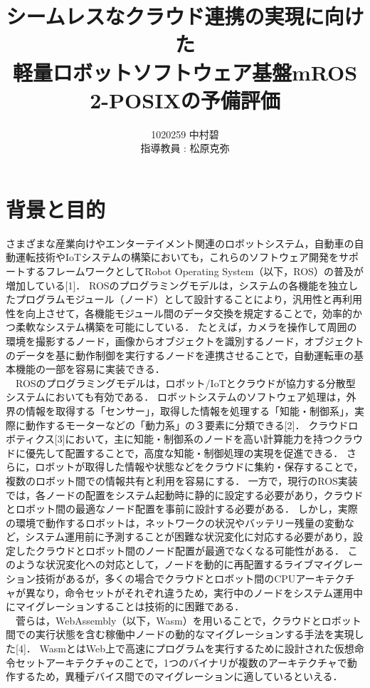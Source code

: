 \documentclass[11pt]{ujarticle}
\author{%
1020259 中村碧\\指導教員 : 松原克弥
}
\title{シームレスなクラウド連携の実現に向けた\\軽量ロボットソフトウェア基盤mROS 2-POSIXの予備評価}
\begin{document}
\maketitle

\section{背景と目的}
\label{sec:introduction}
さまざまな産業向けやエンターテイメント関連のロボットシステム，自動車の自動運転技術やIoTシステムの構築においても，これらのソフトウェア開発をサポートするフレームワークとしてRobot Operating System（以下，ROS）の普及が増加している[1]．
ROSのプログラミングモデルは，システムの各機能を独立したプログラムモジュール（ノード）として設計することにより，汎用性と再利用性を向上させて，各機能モジュール間のデータ交換を規定することで，効率的かつ柔軟なシステム構築を可能にしている．
たとえば，カメラを操作して周囲の環境を撮影するノード，画像からオブジェクトを識別するノード，オブジェクトのデータを基に動作制御を実行するノードを連携させることで，自動運転車の基本機能の一部を容易に実装できる．
\\　ROSのプログラミングモデルは，ロボット/IoTとクラウドが協力する分散型システムにおいても有効である．
ロボットシステムのソフトウェア処理は，外界の情報を取得する「センサー」，取得した情報を処理する「知能・制御系」，実際に動作するモーターなどの「動力系」の３要素に分類できる[2]．
クラウドロボティクス[3]において，主に知能・制御系のノードを高い計算能力を持つクラウドに優先して配置することで，高度な知能・制御処理の実現を促進できる．
さらに，ロボットが取得した情報や状態などをクラウドに集約・保存することで，複数のロボット間での情報共有と利用を容易にする．
一方で，現行のROS実装では，各ノードの配置をシステム起動時に静的に設定する必要があり，クラウドとロボット間の最適なノード配置を事前に設計する必要がある．
しかし，実際の環境で動作するロボットは，ネットワークの状況やバッテリー残量の変動など，システム運用前に予測することが困難な状況変化に対応する必要があり，設定したクラウドとロボット間のノード配置が最適でなくなる可能性がある．
このような状況変化への対応として，ノードを動的に再配置するライブマイグレーション技術があるが，多くの場合でクラウドとロボット間のCPUアーキテクチャが異なり，命令セットがそれぞれ違うため，実行中のノードをシステム運用中にマイグレーションすることは技術的に困難である．
\\　菅らは，WebAssembly（以下，Wasm）を用いることで，クラウドとロボット間での実行状態を含む稼働中ノードの動的なマイグレーションする手法を実現した[4]．
WasmとはWeb上で高速にプログラムを実行するために設計された仮想命令セットアーキテクチャのことで，1つのバイナリが複数のアーキテクチャで動作するため，異種デバイス間でのマイグレーションに適しているといえる．
\end{document}
